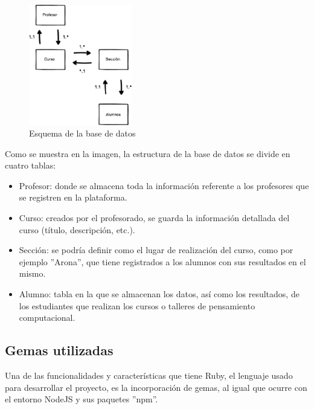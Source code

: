 \begin{figure}[!th]
\begin{center}
\includegraphics[width=0.4\textwidth]{images/base_de_datos.eps}
\caption{Esquema de la base de datos}
\label{fig:10}
\end{center}
\end{figure}

Como se muestra en la imagen, la estructura de la base de datos se divide en cuatro tablas:

\begin{itemize}
    \item Profesor: donde se almacena toda la información referente a los profesores que se registren en la plataforma.
    \item Curso: creados por el profesorado, se guarda la información detallada del curso (título, descripción, etc.).
    \item Sección: se podría definir como el lugar de realización del curso, como por ejemplo ''Arona'', que tiene registrados a los alumnos con sus resultados en el mismo.
    \item Alumno: tabla en la que se almacenan los datos, así como los resultados, de los estudiantes que realizan los cursos o talleres de pensamiento computacional.
\end{itemize}


\subsection{Gemas utilizadas}
\label{1:sec:2}

Una de las funcionalidades y características que tiene Ruby, el lenguaje usado para desarrollar el proyecto, es la incorporación de gemas, al igual que ocurre con el entorno NodeJS y sus paquetes ''npm''.

